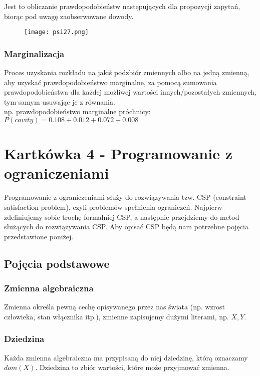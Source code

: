 \documentclass[a4paper,15pt]{article}
\begin{document}
Jest to obliczanie prawdopodobieństw następujących dla propozycji zapytań, biorąc pod uwagę zaobserwowane dowody. 

\begin{figure}[H]
\centerline{\texttt{[image: psi27.png]}}
\end{figure}


\subsubsection{Marginalizacja}

Proces uzyskania rozkładu na jakiś podzbiór zmiennych albo na jedną zmienną, aby uzyskać prawdopodobieństwo marginalne, za pomocą sumowania prawdopodobieństwa dla każdej możliwej wartości innych/pozostałych zmiennych, tym samym usuwając je z równania.\\

np. prawdopodobieństwo marginalne próchnicy: $P(cavity) = 0.108+0.012+0.072+0.008$ 

\newpage
\section{Kartkówka 4 - Programowanie z ograniczeniami}

Programowanie z ograniczeniami służy do rozwiązywania tzw. CSP (constraint satisfaction problem), czyli problemów spełnienia ograniczeń. Najpierw zdefiniujemy sobie trochę formalniej CSP, a następnie przejdziemy do metod służących do rozwiązywania CSP. Aby opisać CSP będą nam potrzebne pojęcia przedstawione poniżej.  

\subsection{Pojęcia podstawowe}

\subsubsection{Zmienna algebraiczna}
Zmienna określa pewną cechę opisywanego przez nas świata (np. wzrost człowieka, stan włącznika itp.), zmienne zapisujemy dużymi literami, np. $X,Y$.

\subsubsection{Dziedzina}
Każda zmienna algebraiczna ma przypisaną do niej dziedzinę, którą oznaczamy $dom(X)$. Dziedzina to zbiór wartości, które może przyjmować zmienna. \\
\end{document}
